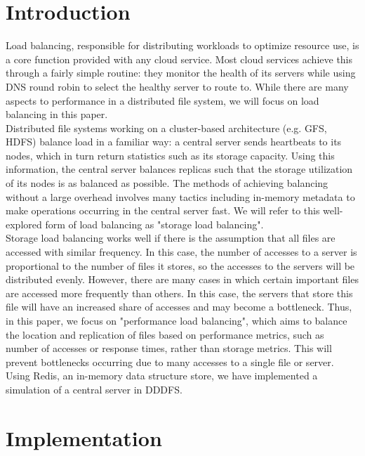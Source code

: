 \documentclass[twoside]{article}
\begin{document}
\begin{multicols}{2} %

\section{Introduction}
Load balancing, responsible for distributing workloads to optimize resource use, is a core function provided with any cloud service. Most cloud services achieve this through a fairly simple routine: they monitor the health of its servers while using DNS round robin to select the healthy server to route to. While there are many aspects to performance in a distributed file system, we will focus on load balancing in this paper.\\\indent
Distributed file systems working on a cluster-based architecture (e.g. GFS, HDFS) balance load in a familiar way: a central server sends heartbeats to its nodes, which in turn return statistics such as its storage capacity.  Using this information, the central server balances replicas such that the storage utilization of its nodes is as balanced as possible. The methods of achieving balancing without a large overhead involves many tactics including in-memory metadata to make operations occurring in the central server fast. We will refer to this well-explored form of load balancing as "storage load balancing".\\\indent
Storage load balancing works well if there is the assumption that all files are accessed with similar frequency. In this case, the number of accesses to a server is proportional to the number of files it stores, so the accesses to the servers will be distributed evenly. However, there are many cases in which certain important files are accessed more frequently than others. In this case, the servers that store this file will have an increased share of accesses and may become a bottleneck. Thus, in this paper, we focus on "performance load balancing", which aims to balance the location and replication of files based on performance metrics, such as number of accesses or response times, rather than storage metrics. This will prevent bottlenecks occurring due to many accesses to a single file or server. Using Redis, an in-memory data structure store, we have implemented a simulation of a central server in DDDFS.


\section{Implementation}

\end{multicols}
\end{document}

